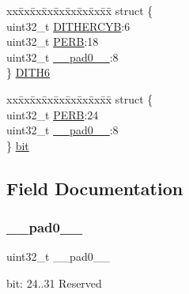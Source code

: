 \begin{DoxyCompactItemize}
\begin{tabbing}
\end{tabbing}\item 
\begin{tabbing}
xx\=xx\=xx\=xx\=xx\=xx\=xx\=xx\=xx\=\kill
struct \{\\
\>uint32\_t \mbox{\hyperlink{union_t_c_c___p_e_r_b___type_a156fbeb3ca1ed9f6622afd99724ad24c}{DITHERCYB}}:6\\
\>uint32\_t \mbox{\hyperlink{union_t_c_c___p_e_r_b___type_a097c0f751731b2d8c768978685a6c55f}{PERB}}:18\\
\>uint32\_t \mbox{\hyperlink{union_t_c_c___p_e_r_b___type_a3e57c2ef1c3ffb36722f000cc1156824}{\_\_pad0\_\_}}:8\\
\} \mbox{\hyperlink{union_t_c_c___p_e_r_b___type_aea8b555bb3e6879e259ac765e9b0b383}{DITH6}}\\

\end{tabbing}\item 
\begin{tabbing}
xx\=xx\=xx\=xx\=xx\=xx\=xx\=xx\=xx\=\kill
struct \{\\
\>uint32\_t \mbox{\hyperlink{union_t_c_c___p_e_r_b___type_a097c0f751731b2d8c768978685a6c55f}{PERB}}:24\\
\>uint32\_t \mbox{\hyperlink{union_t_c_c___p_e_r_b___type_a3e57c2ef1c3ffb36722f000cc1156824}{\_\_pad0\_\_}}:8\\
\} \mbox{\hyperlink{union_t_c_c___p_e_r_b___type_a1c34146d1715bd2295afcdd4da38b1d8}{bit}}\\

\end{tabbing}\end{DoxyCompactItemize}


\subsection{Field Documentation}
\mbox{\label{union_t_c_c___p_e_r_b___type_a3e57c2ef1c3ffb36722f000cc1156824}} 
\subsubsection{\texorpdfstring{\_\_pad0\_\_}{\_\_pad0\_\_}}
{\footnotesize\ttfamily uint32\+\_\+t \+\_\+\+\_\+pad0\+\_\+\+\_\+}

bit\+: 24..31 Reserved \mbox{\label{union_t_c_c___p_e_r_b___type_a637d30c877598ce591ee8597c7e3dd18}} 

